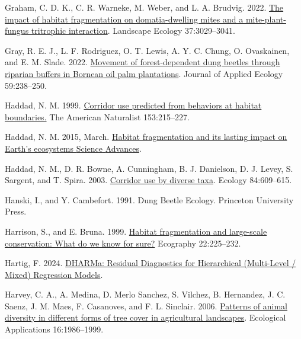 \documentclass[
  man, donotrepeattitle]{apa6}
\newlength{\cslhangindent}
\newenvironment{CSLReferences}[2] %
 {\begin{list}{}{%
  \setlength{\itemindent}{0pt}
  \setlength{\leftmargin}{0pt}
  \setlength{\parsep}{0pt}
  \ifodd #1
   \setlength{\leftmargin}{\cslhangindent}
   \setlength{\itemindent}{-1\cslhangindent}
  \fi
  \setlength{\itemsep}{#2\baselineskip}}}
 {\end{list}}
\begin{document}
\begin{CSLReferences}{1}{0}
Graham, C. D. K., C. R. Warneke, M. Weber, and L. A. Brudvig. 2022. \href{https://doi.org/10.1007/s10980-022-01529-2}{The impact of habitat fragmentation on domatia-dwelling mites and a mite-plant-fungus tritrophic interaction}. Landscape Ecology 37:3029--3041.

Gray, R. E. J., L. F. Rodriguez, O. T. Lewis, A. Y. C. Chung, O. Ovaskainen, and E. M. Slade. 2022. \href{https://doi.org/10.1111/1365-2664.14049}{Movement of forest-dependent dung beetles through riparian buffers in {Bornean} oil palm plantations}. Journal of Applied Ecology 59:238--250.

Haddad, N. M. 1999. \href{https://doi.org/10.1086/303163}{Corridor use predicted from behaviors at habitat boundaries.} The American Naturalist 153:215--227.

Haddad, N. M. 2015, March. \href{https://www-science-org.lp.hscl.ufl.edu/doi/10.1126/sciadv.1500052}{Habitat fragmentation and its lasting impact on {Earth}'s ecosystems {\textbar} {Science} {Advances}}.

Haddad, N. M., D. R. Bowne, A. Cunningham, B. J. Danielson, D. J. Levey, S. Sargent, and T. Spira. 2003. \href{https://doi.org/10.1890/0012-9658(2003)084\%5B0609:CUBDT\%5D2.0.CO;2}{Corridor use by diverse taxa}. Ecology 84:609--615.

Hanski, I., and Y. Cambefort. 1991. Dung {Beetle} {Ecology}. Princeton University Press.

Harrison, S., and E. Bruna. 1999. \href{https://doi.org/10.1111/j.1600-0587.1999.tb00496.x}{Habitat fragmentation and large-scale conservation: What do we know for sure?} Ecography 22:225--232.

Hartig, F. 2024. \href{https://CRAN.R-project.org/package=DHARMa}{{DHARMa}: {Residual} {Diagnostics} for {Hierarchical} ({Multi}-{Level} / {Mixed}) {Regression} {Models}}.

Harvey, C. A., A. Medina, D. Merlo Sanchez, S. Vilchez, B. Hernandez, J. C. Saenz, J. M. Maes, F. Casanoves, and F. L. Sinclair. 2006. \href{https://doi.org/10.1890/1051-0761(2006)016\%7B\%5B\%7D1986:POADID\%5D2.0.CO;2}{Patterns of animal diversity in different forms of tree cover in agricultural landscapes}. Ecological Applications 16:1986--1999.


\end{CSLReferences}
\end{document}
